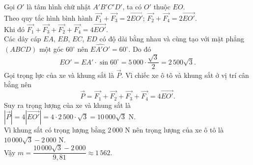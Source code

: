 \begin{ex}
{ Gọi $O'$ là tâm hình chữ nhật $A'B'C'D'$, ta có $O'$ thuộc $EO$.\\ 
 Theo quy tắc hình bình hành $\overrightarrow{F_1}+\overrightarrow{F_3}=2\overrightarrow{EO'}$; $\overrightarrow{F_2}+\overrightarrow{F_4}=2\overrightarrow{EO'}$.\\
 Khi đó
 $\overrightarrow{F_1}+\overrightarrow{F_3}+\overrightarrow{F_2}+\overrightarrow{F_4}=4\overrightarrow{EO'}$.\\
 Các dây cáp $EA$, $EB$, $EC$, $ED$ có độ dài bằng nhau và cùng tạo với mặt phẳng $(ABCD)$ một góc $60^\circ$ nên $\widehat{EA'O'}=60^\circ$. Do đó\\
 \[EO'=EA'\cdot\sin 60^\circ=5\, 000\cdot\dfrac{\sqrt{3}}{2}=2\, 500\sqrt{3}.\]
 Gọi trọng lực của xe và khung sắt là $\overrightarrow{P}$. Vì chiếc xe ô tô và khung sắt ở vị trí cân bằng nên 
 \[\overrightarrow{P}=\overrightarrow{F_1}+\overrightarrow{F_2}+\overrightarrow{F_3}+\overrightarrow{F_4} = 4\overrightarrow{EO'}.\]
 Suy ra trọng lượng của xe và khung sắt là $\left|\overrightarrow{P}\right| = 4\left|\overrightarrow{EO'}\right| = 4\cdot 2\,500\cdot \sqrt{3} = 10\,000\sqrt{3}$ N.\\
 Vì khung sắt có trọng lượng bằng $2\,000$ N nên trọng lượng của xe ô tô là $10\,000\sqrt{3}-2\,000$ N.\\
 Vậy $m=\dfrac{10\,000\sqrt{3}-2\,000}{9{,}81}\approx 1\,562$.
 }
\end{ex}


